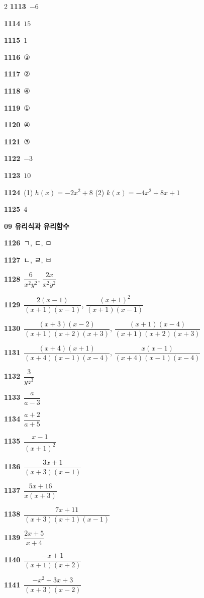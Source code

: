 \documentclass[10pt,a4paper]{article}
\begin{document}
\begin{multicols}{2}
\noindent\textbf{1113}\ $-6$\par
\noindent\textbf{1114}\ $15$\par
\noindent\textbf{1115}\ $1$\par
\noindent\textbf{1116}\ ③\par
\noindent\textbf{1117}\ ②\par
\noindent\textbf{1118}\ ④\par
\noindent\textbf{1119}\ ①\par
\noindent\textbf{1120}\ ④\par
\noindent\textbf{1121}\ ③\par
\noindent\textbf{1122}\ $-3$\par
\noindent\textbf{1123}\ $10$\par
\noindent\textbf{1124}\ (1) $h(x)=-2x^2+8$ (2) $k(x)=-4x^2+8x+1$\par
\noindent\textbf{1125}\ $4$\par
\noindent\textbf{09 유리식과 유리함수}\par\smallskip
\noindent\textbf{1126}\ ㄱ, ㄷ, ㅁ\par
\noindent\textbf{1127}\ ㄴ, ㄹ, ㅂ\par
\noindent\textbf{1128}\ $\dfrac{6}{x^2y^2}$, $\dfrac{2x}{x^2y^2}$\par
\noindent\textbf{1129}\ $\dfrac{2(x-1)}{(x+1)(x-1)}$, $\dfrac{(x+1)^2}{(x+1)(x-1)}$\par
\noindent\textbf{1130}\ $\dfrac{(x+3)(x-2)}{(x+1)(x+2)(x+3)}$, $\dfrac{(x+1)(x-4)}{(x+1)(x+2)(x+3)}$\par
\noindent\textbf{1131}\ $\dfrac{(x+4)(x+1)}{(x+4)(x-1)(x-4)}$, $\dfrac{x(x-1)}{(x+4)(x-1)(x-4)}$\par
\noindent\textbf{1132}\ $\dfrac{3}{yz^3}$\par
\noindent\textbf{1133}\ $\dfrac{a}{a-3}$\par
\noindent\textbf{1134}\ $\dfrac{a+2}{a+5}$\par
\noindent\textbf{1135}\ $\dfrac{x-1}{(x+1)^2}$\par
\noindent\textbf{1136}\ $\dfrac{3x+1}{(x+3)(x-1)}$\par
\noindent\textbf{1137}\ $\dfrac{5x+16}{x(x+3)}$\par
\noindent\textbf{1138}\ $\dfrac{7x+11}{(x+3)(x+1)(x-1)}$\par
\noindent\textbf{1139}\ $\dfrac{2x+5}{x+4}$\par
\noindent\textbf{1140}\ $\dfrac{-x+1}{(x+1)(x+2)}$\par
\noindent\textbf{1141}\ $\dfrac{-x^2+3x+3}{(x+3)(x-2)}$\par

\end{multicols}
\end{document}
